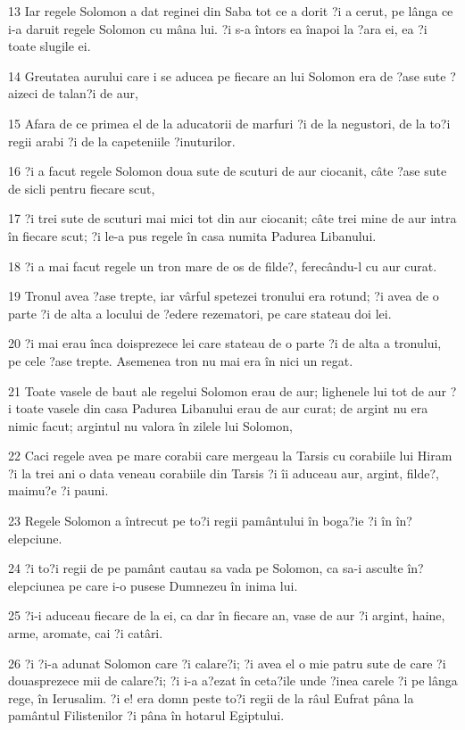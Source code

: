 \par 13 Iar regele Solomon a dat reginei din Saba tot ce a dorit ?i a cerut, pe lânga ce i-a daruit regele Solomon cu mâna lui. ?i s-a întors ea înapoi la ?ara ei, ea ?i toate slugile ei.
\par 14 Greutatea aurului care i se aducea pe fiecare an lui Solomon era de ?ase sute ?aizeci de talan?i de aur,
\par 15 Afara de ce primea el de la aducatorii de marfuri ?i de la negustori, de la to?i regii arabi ?i de la capeteniile ?inuturilor.
\par 16 ?i a facut regele Solomon doua sute de scuturi de aur ciocanit, câte ?ase sute de sicli pentru fiecare scut,
\par 17 ?i trei sute de scuturi mai mici tot din aur ciocanit; câte trei mine de aur intra în fiecare scut; ?i le-a pus regele în casa numita Padurea Libanului.
\par 18 ?i a mai facut regele un tron mare de os de filde?, ferecându-l cu aur curat.
\par 19 Tronul avea ?ase trepte, iar vârful spetezei tronului era rotund; ?i avea de o parte ?i de alta a locului de ?edere rezematori, pe care stateau doi lei.
\par 20 ?i mai erau înca doisprezece lei care stateau de o parte ?i de alta a tronului, pe cele ?ase trepte. Asemenea tron nu mai era în nici un regat.
\par 21 Toate vasele de baut ale regelui Solomon erau de aur; lighenele lui tot de aur ?i toate vasele din casa Padurea Libanului erau de aur curat; de argint nu era nimic facut; argintul nu valora în zilele lui Solomon,
\par 22 Caci regele avea pe mare corabii care mergeau la Tarsis cu corabiile lui Hiram ?i la trei ani o data veneau corabiile din Tarsis ?i îi aduceau aur, argint, filde?, maimu?e ?i pauni.
\par 23 Regele Solomon a întrecut pe to?i regii pamântului în boga?ie ?i în în?elepciune.
\par 24 ?i to?i regii de pe pamânt cautau sa vada pe Solomon, ca sa-i asculte în?elepciunea pe care i-o pusese Dumnezeu în inima lui.
\par 25 ?i-i aduceau fiecare de la ei, ca dar în fiecare an, vase de aur ?i argint, haine, arme, aromate, cai ?i catâri.
\par 26 ?i ?i-a adunat Solomon care ?i calare?i; ?i avea el o mie patru sute de care ?i douasprezece mii de calare?i; ?i i-a a?ezat în ceta?ile unde ?inea carele ?i pe lânga rege, în Ierusalim. ?i e! era domn peste to?i regii de la râul Eufrat pâna la pamântul Filistenilor ?i pâna în hotarul Egiptului.
